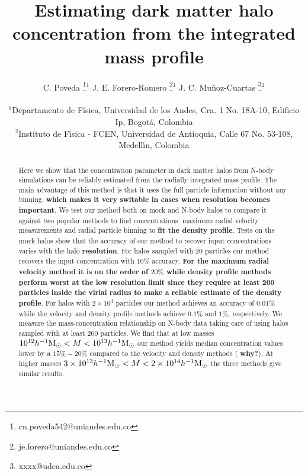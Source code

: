 \documentclass[a4,useAMS,usenatbib,usegraphicx]{mn2e}
\newcommand{\hMsun}{{\ifmmode{h^{-1}{\rm {M_{\odot}}}}\else{$h^{-1}{\rm{M_{\odot}}}$}\fi}}
\begin{document}
\title{Estimating dark matter halo concentration from the integrated mass profile}
\author[C. Poveda, J.E. Forero-Romero, J.C. Mu\~noz-Cuartas]{
\parbox[t]{\textwidth}{\raggedright 
  C. Poveda \thanks{cn.poveda542@uniandes.edu.co}$^{1}$
  J. E. Forero-Romero \thanks{je.forero@uniandes.edu.co}$^{1}$
  J. C. Mu\~noz-Cuartas \thanks{xxxx@udea.edu.co}$^{2}$
}
\vspace*{6pt}\\
$^1$Departamento de F\'{i}sica, Universidad de los Andes, Cra. 1
No. 18A-10, Edificio Ip, Bogot\'a, Colombia\\
$^2$Instituto de F\'{\i}sica - FCEN, Universidad de Antioquia, Calle
67 No. 53-108, Medell\'{\i}n, Colombia
}

\maketitle

\begin{abstract}

Here we show that the concentration parameter in dark matter halos from
N-body simulations can be reliably estimated from the radially integrated mass
profile.
The main advantage of this method is that it uses the full
particle information without any binning, {\bf which makes it very
  switable in cases when resolution becomes important}. We test our
method both on mock and N-body halos to compare it against two popular
methods to find concentrations: maximum radial velocity measurements
and radial particle binning to {\bf fit the density profile}. Tests on
the mock halos show that the accuracy of our method to recover input
concentrations varies with the halo {\bf resolution}. For halos
sampled with $20$ particles our method recovers the input
concentration with $10\%$ accuracy. {\bf For the maximum radial
  velocity method it is on the order of $20\%$ while density profile
  methods perform worst at the low resolution limit since they require
  at least 200 particles inside the virial radius to make a reliable
  estimate of the density profile}. For halos with $2\times 10^4$
particles our method achieves an accuracy of $0.01\%$ while the
velocity and density profile methods achieve $0.1\%$ and $1\%$,
respectively. We measure the mass-concentration relationship on N-body
data taking care of using halos sampled with at least $200$
particles. We find that at low masses $10^{12}\hMsun <
M<10^{13}\hMsun$ our method yields median concentration values lower
by a $15\%-20\%$ compared to the velocity and density methods ({\bf
  why?}).  At higher masses $3\times 10^{13}\hMsun < M < 2\times
10^{14}\hMsun$ the three methods give similar results.
\end{abstract}
\end{document}
